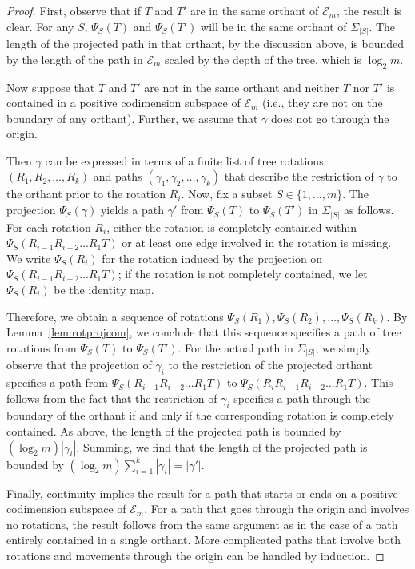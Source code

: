 \documentclass[a4paper,11pt]{article}
\newcommand{\aE}{\mathcal{E}}
\begin{document}
\begin{proof}
First, observe that if $T$ and $T'$ are in the same orthant of $\aE_m$, the result is clear. 
For any $S$, $\Psi_S(T)$ and $\Psi_S(T')$ will be in the same orthant of $\Sigma_{|S|}$.
The length of the projected path in that orthant, by the discussion above, is bounded by the length of the path in $\aE_m$ scaled by the depth of the tree, which is $\log_2 m$.

Now suppose that $T$ and $T'$ are not in the same orthant and neither $T$ nor $T'$ is contained in a positive codimension subspace of $\aE_m$ (i.e., they are not on the boundary of any orthant).
Further, we assume that $\gamma$ does not go through the origin.

Then $\gamma$ can be expressed in terms of a finite list of tree rotations $(R_1, R_2, \ldots, R_k)$ and paths $(\gamma_1, \gamma_2, \ldots, \gamma_k)$ that describe the restriction of $\gamma$ to the orthant prior to the rotation $R_i$.
Now, fix a subset $S \in \{1,\ldots,m\}$.
The projection $\Psi_S(\gamma)$ yields a path $\gamma'$ from $\Psi_S(T)$ to $\Psi_S(T')$ in $\Sigma_{|S|}$ as follows.
For each rotation $R_i$, either the rotation is completely contained within $\Psi_S(R_{i-1} R_{i-2} \ldots R_1 T)$ or at least one edge involved in the rotation is missing.
We write $\Psi_S(R_i)$ for the rotation induced by the projection on $\Psi_S(R_{i-1} R_{i-2} \ldots R_1 T)$; if the rotation is not completely contained, we let $\Psi_S(R_i)$ be the identity map.

Therefore, we obtain a sequence of rotations $\Psi_S(R_1), \Psi_S(R_2), \ldots, \Psi_S(R_k)$.
By Lemma~\ref{lem:rotprojcom}, we conclude that this sequence specifies a path of tree rotations from $\Psi_S(T)$ to $\Psi_S(T')$.
For the actual path in $\Sigma_{|S|}$, we simply observe that the projection of $\gamma_i$ to the restriction of the projected orthant specifies a path from $\Psi_S(R_{i-1} R_{i-2} \ldots R_1 T)$ to $\Psi_S(R_i R_{i-1} R_{i-2} \ldots R_1 T)$.
This follows from the fact that the restriction of $\gamma_i$ specifies a path through the boundary of the orthant if and only if the corresponding rotation is completely contained.
As above, the length of the projected path is bounded by $(\log_2 m) |\gamma_i|$.
Summing, we find that the length of the projected path is bounded by $(\log_2 m) \sum_{i=1}^k |\gamma_i| = |\gamma'|$.

Finally, continuity implies the result for a path that starts or ends on a positive codimension subspace of $\aE_m$.
For a path that goes through the origin and involves no rotations, the result follows from the same argument as in the case of a path entirely contained in a single orthant.
More complicated paths that involve both rotations and movements through the origin can be handled by induction.
\end{proof}
\end{document}
